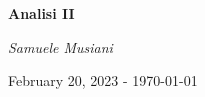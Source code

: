 \thispagestyle{empty}

\begin{center}
	\vfill
    \vspace*{0.3\textheight}

	\Huge
	\textbf{Analisi II}
	
	\vspace{1cm}
	
	\Large
	\textit{Samuele Musiani}
	
	\vspace{3cm}
	
	\large
	February 20, 2023 - \today
	
    \normalsize
    
\end{center}
